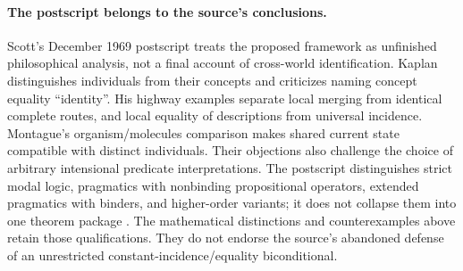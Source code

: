 \paragraph{The postscript belongs to the source's conclusions.}
Scott's December 1969 postscript treats the proposed framework as
unfinished philosophical analysis, not a final account of cross-world
identification. Kaplan distinguishes individuals from their concepts and
criticizes naming concept equality ``identity''. His highway examples
separate local merging from identical complete routes, and local equality
of descriptions from universal incidence. Montague's organism/molecules
comparison makes shared current state compatible with distinct individuals.
Their objections also challenge the choice of arbitrary intensional
predicate interpretations. The postscript distinguishes strict modal
logic, pragmatics with nonbinding propositional operators, extended
pragmatics with binders, and higher-order variants; it does not collapse
them into one theorem package \cite[pp.~171--173]{Scott1970}.
The mathematical distinctions and counterexamples above retain those
qualifications. They do not endorse the source's abandoned defense of
an unrestricted constant-incidence/equality biconditional.
